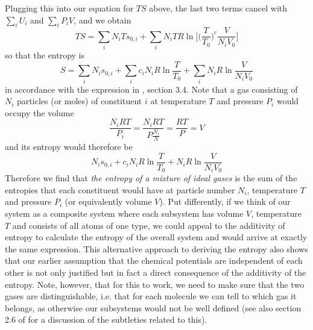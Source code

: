 \documentclass[a4paper, draft]{article}
\theoremstyle{own}
\theoremstyle{remark}
\begin{document}
Plugging this into our equation for $TS$ above, the last two terms cancel with $\sum_i U_i$ and $\sum_i P_i V$, and we obtain
$$
TS =  \sum_i N_i T s_{0, i} + \sum_i  N_i T R \ln \big[ \big(  \frac{T}{T_0} \big)^{c} \frac{V}{N_i V_0} \big]
$$
so that the entropy is
$$
S = \sum_i N_i  s_{0, i} + \sum_i  c_i N_i R \ln   \frac{T}{T_0}  +  \sum_i  N_i R \ln \frac{V}{N_i V_0} 
$$
in accordance with the expression in \cite{Callen}, section 3.4. Note that a gas consisting of $N_i$ particles (or moles) of constituent $i$ at temperature $T$ and pressure $P_i$ would occupy the volume
$$
\frac{N_i RT}{P_i} = \frac{N_i RT}{P \frac{N_i}{N}} = \frac{RT}{P} = V
$$
and its entropy would therefore be
$$
 N_i  s_{0, i} +  c_i N_i R \ln   \frac{T}{T_0}  +   N_i R \ln \frac{V}{N_i V_0} 
$$
Therefore we find that {\em the entropy of a mixture of ideal gases} is the sum of the entropies that each constituent would have at particle number $N_i$, temperature $T$ and pressure $P_i$ (or equivalently volume $V$). Put differently, if we think of our system as a composite system where each subsystem has volume $V$, temperature $T$ and consists of all atoms of one type, we could appeal to the additivity of entropy to calculate the entropy of the overall system and would arrive at exactly the same expression. This alternative approach to deriving the entropy also shows that our earlier assumption that the chemical potentials are independent of each other is not only justified but in fact a direct consequence of the additivity of the entropy. Note, however, that for this to work, we need to make sure that the two gases are distinguishable, i.e. that for each molecule we can tell to which gas it belongs, as otherwise our subsystems would not be well defined (see also section 2.6 of \cite{Schroeder} for a discussion of the subtleties related to this).
\end{document}
